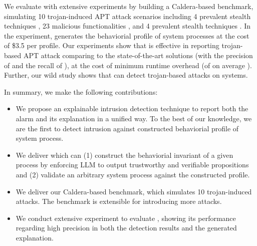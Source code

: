 We evaluate \tool with extensive experiments by building a Caldera-based benchmark,
simulating 10 trojan-induced APT attack scenarios including 
4 prevalent stealth techniques \cite{xx}, 
23 malicious functionalities \cite{xx}, and 
4 prevalent stealth techniques \cite{xx}.
In the experiment, \tool generates the behaviorial profile of  system processes
at the cost of \$3.5 per profile.
Our experiments show that 
\tool is effective in reporting trojan-based APT attack comparing to the state-of-the-art solutions (with the precision of  and the recall of ),
at the cost of minimum runtime overhead (of on average ).
Further, our wild study shows that \tool can detect  trojan-based attacks on  systems.

In summary, we make the following contributions:
\begin{itemize}[leftmargin=*]
  \item We propose an explainable intrusion detection technique \tool to report both the alarm and its explanation in a unified way. 
      To the best of our knowledge, we are the first to detect intrusion against constructed behaviorial profile of system process.
  \item We deliver \tool which can 
    (1) construct the behaviorial invariant of a given process by enforcing LLM to output trustworthy and verifiable propositions and
    (2) validate an arbitrary system process against the constructed profile.
  \item We deliver our Caldera-based benchmark, which simulates 10 trojan-induced attacks. 
    The benchmark is extensible for introducing more attacks.
  \item We conduct extensive experiment to evaluate \tool, showing its performance regarding high precision in both the detection results and the generated explanation.
\end{itemize}
 





